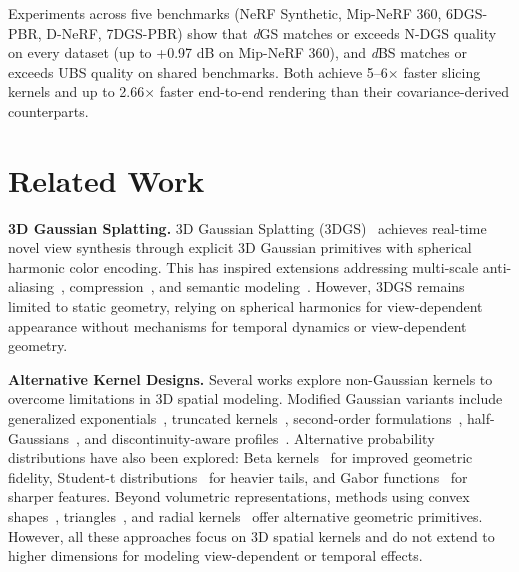 \documentclass{article}
\newcommand{\dgs}{\textit{d}GS\xspace}
\newcommand{\dbs}{\textit{d}BS\xspace}
\theoremstyle{plain}
\theoremstyle{definition}
\theoremstyle{remark}
\begin{document}
Experiments across five benchmarks (NeRF Synthetic, Mip-NeRF 360, 6DGS-PBR, D-NeRF, 7DGS-PBR) show that \dgs{} matches or exceeds N-DGS quality on every dataset (up to +0.97 dB on Mip-NeRF 360), and \dbs{} matches or exceeds UBS quality on shared benchmarks. Both achieve 5--6$\times$ faster slicing kernels and up to 2.66$\times$ faster end-to-end rendering than their covariance-derived counterparts.


\section{Related Work}
\label{sec:related_work}

\textbf{3D Gaussian Splatting.}
3D Gaussian Splatting (3DGS)~\citep{3dgs} achieves real-time novel view synthesis through explicit 3D Gaussian primitives with spherical harmonic color encoding. This has inspired extensions addressing multi-scale anti-aliasing~\citep{yu2023mipsplattingaliasfree3dgaussian,yan2024multiscale3dgaussiansplatting}, compression~\cite{lee2024compact,morgenstern2024compact}, and semantic modeling~\cite{shi2023languageembedded3dgaussians,zhou2024feature3dgssupercharging3d}. However, 3DGS remains limited to static geometry, relying on spherical harmonics for view-dependent appearance without mechanisms for temporal dynamics or view-dependent geometry.

\textbf{Alternative Kernel Designs.}
Several works explore non-Gaussian kernels to overcome limitations in 3D spatial modeling. Modified Gaussian variants include generalized exponentials~\cite{hamdi2024gesgeneralizedexponentialsplatting}, truncated kernels~\cite{liu2025tnt}, second-order formulations~\cite{zhang2025quadratic}, half-Gaussians~\cite{li20253d}, and discontinuity-aware profiles~\cite{qu2024disc}. Alternative probability distributions have also been explored: Beta kernels~\cite{liu2025deformable} for improved geometric fidelity, Student-t distributions~\cite{zhu20253dstudentsplattingscooping} for heavier tails, and Gabor functions~\cite{zhou20253dgabsplat3dgaborsplatting} for sharper features. Beyond volumetric representations, methods using convex shapes~\cite{held20243dconvexsplattingradiance}, triangles~\cite{held2025triangle}, and radial kernels~\cite{huang2025deformable} offer alternative geometric primitives. However, all these approaches focus on 3D spatial kernels and do not extend to higher dimensions for modeling view-dependent or temporal effects.
\end{document}
